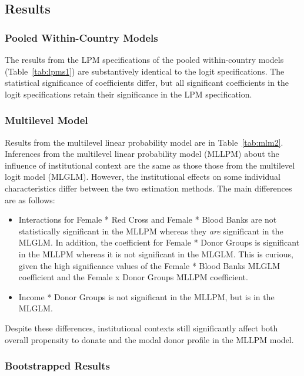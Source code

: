 \documentclass[11pt,article,oneside]{memoir}
\begin{document}
\subsection{Results}

\subsubsection{Pooled Within-Country Models}

The results from the LPM specifications of the pooled within-country models (Table~\ref{tab:lpms1}) are substantively identical to the logit specifications. The statistical significance of coefficients differ, but all significant coefficients in the logit specifications retain their significance in the LPM specification.


\subsubsection{Multilevel Model}

Results from the multilevel linear probability model are in Table~\ref{tab:mlm2}. Inferences from the multilevel linear probability model (MLLPM) about the influence of institutional context are the same as those those from the multilevel logit model (MLGLM). However, the institutional effects on some individual characteristics differ between the two estimation methods. The main differences are as follows:

\begin{itemize}
\item Interactions for Female * Red Cross and Female * Blood Banks are not statistically significant in the MLLPM whereas they \emph{are} significant in the MLGLM. In addition, the coefficient for Female * Donor Groups is significant in the MLLPM whereas it is not significant in the MLGLM. This is curious, given the high significance values of the Female * Blood Banks MLGLM coefficient and the Female x Donor Groups MLLPM coefficient.
\item Income * Donor Groups is not significant in the MLLPM, but is in the MLGLM.
\end{itemize}

Despite these differences, institutional contexts still significantly affect both overall propensity to donate and the modal donor profile in the MLLPM model.

\subsubsection{Bootstrapped Results}
\end{document}
